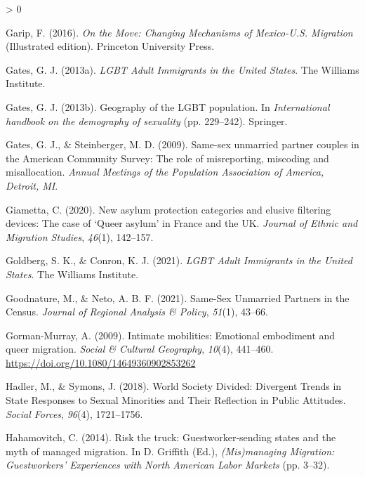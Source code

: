 \documentclass[
  11pt,
]{article}
\newlength{\cslhangindent}
\newenvironment{CSLReferences}[2] %
 {%
  \setlength{\parindent}{0pt}
  \ifodd #1 \everypar{\setlength{\hangindent}{\cslhangindent}}\ignorespaces\fi
  \ifnum #2 > 0
  \setlength{\parskip}{#2\baselineskip}
  \fi
 }%
 {}
\begin{document}
\begin{CSLReferences}{1}{0}
\leavevmode\hypertarget{ref-garip_2016}{}%
Garip, F. (2016). \emph{On the {Move}: {Changing Mechanisms} of {Mexico}-{U}.{S}. {Migration}} (Illustrated edition). {Princeton University Press}.

\leavevmode\hypertarget{ref-gates_2013}{}%
Gates, G. J. (2013a). \emph{{LGBT Adult Immigrants} in the {United States}}. {The Williams Institute}.

\leavevmode\hypertarget{ref-gates_2013a}{}%
Gates, G. J. (2013b). Geography of the {LGBT} population. In \emph{International handbook on the demography of sexuality} (pp. 229--242). {Springer}.

\leavevmode\hypertarget{ref-gates_2009}{}%
Gates, G. J., \& Steinberger, M. D. (2009). Same-sex unmarried partner couples in the {American Community Survey}: {The} role of misreporting, miscoding and misallocation. \emph{Annual Meetings of the Population Association of America, Detroit, {MI}}.

\leavevmode\hypertarget{ref-giametta_2020}{}%
Giametta, C. (2020). New asylum protection categories and elusive filtering devices: The case of {`{Queer} asylum'} in {France} and the {UK}. \emph{Journal of Ethnic and Migration Studies}, \emph{46}(1), 142--157.

\leavevmode\hypertarget{ref-goldberg_2021}{}%
Goldberg, S. K., \& Conron, K. J. (2021). \emph{{LGBT Adult Immigrants} in the {United States}}. {The Williams Institute}.

\leavevmode\hypertarget{ref-goodnature_2021}{}%
Goodnature, M., \& Neto, A. B. F. (2021). Same-{Sex Unmarried Partners} in the {Census}. \emph{Journal of Regional Analysis \& Policy}, \emph{51}(1), 43--66.

\leavevmode\hypertarget{ref-gorman-murray_2009}{}%
Gorman-Murray, A. (2009). Intimate mobilities: Emotional embodiment and queer migration. \emph{Social \& Cultural Geography}, \emph{10}(4), 441--460. \url{https://doi.org/10.1080/14649360902853262}

\leavevmode\hypertarget{ref-hadler_2018_world}{}%
Hadler, M., \& Symons, J. (2018). World {Society Divided}: {Divergent Trends} in {State Responses} to {Sexual Minorities} and {Their Reflection} in {Public Attitudes}. \emph{Social Forces}, \emph{96}(4), 1721--1756.

\leavevmode\hypertarget{ref-hahamovitch_2014}{}%
Hahamovitch, C. (2014). Risk the truck: {Guestworker}-sending states and the myth of managed migration. In D. Griffith (Ed.), \emph{({Mis})managing {Migration}: {Guestworkers}' {Experiences} with {North American Labor Markets}} (pp. 3--32).


\end{CSLReferences}
\end{document}

